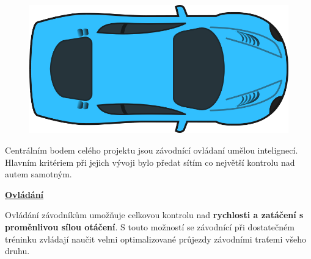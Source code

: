 \documentclass[a4paper,12pt]{article}
\begin{document}
            \begin{figure}[H]
                \centering
                \includegraphics[width=1\textwidth]{../data/carClipArt.jpg}
                \label{fig:carpic}
            \end{figure}


            Centrálním bodem celého projektu jsou závodnící ovládaní umělou intelignecí.
            Hlavním kritériem při jejich vývoji bylo předat sítím co největší kontrolu nad 
            autem samotným. 

            \underline{\textbf{\large{Ovládání}}}
            \begin{figure}[H]
            \centering
            \begin{minipage}[t]{.5\textwidth}
                \centering
            \end{minipage}%
            \begin{minipage}[t]{.5\textwidth}
                \centering
            \end{minipage}
            \label{fig:controlls}
            \end{figure}

            Ovládání závodníkům umožňuje celkovou kontrolu nad \textbf{rychlosti a zatáčení s proměnlivou
            sílou otáčení}. S touto možností se závodnící při dostatečném tréninku zvládají naučit
            velmi optimalizované průjezdy závodními traťemi všeho druhu.\\
\end{document}
